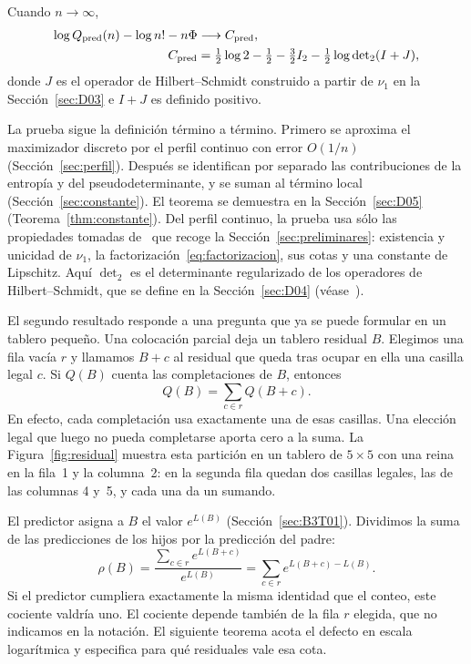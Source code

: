 \begin{teorema}\label{thm:intro-constante}
Cuando $n\to\infty$,
\[
\begin{aligned}
 \log Q_{\rm pred}(n)-\log n!-n\Phi &\longrightarrow C_{\rm pred},\\
 C_{\rm pred} &=\tfrac12\log2-\tfrac12-\tfrac32I_2-\tfrac12\log{\det}_2(I+J),
\end{aligned}
\]
donde $J$ es el operador de Hilbert--Schmidt construido a partir de $\nu_1$ en la
Sección~\ref{sec:D03} e $I+J$ es definido positivo.
\end{teorema}

La prueba sigue la definición término a término. Primero se aproxima el maximizador discreto por
el perfil continuo con error $O(1/n)$ (Sección~\ref{sec:perfil}). Después se identifican por
separado las contribuciones de la entropía y del pseudodeterminante, y se suman al término local
(Sección~\ref{sec:constante}). El teorema se demuestra en la Sección~\ref{sec:D05}
(Teorema~\ref{thm:constante}). Del perfil continuo, la prueba usa sólo las propiedades tomadas
de~\cite{Perfil} que recoge la Sección~\ref{sec:preliminares}: existencia y unicidad de $\nu_1$, la
factorización~\eqref{eq:factorizacion}, sus cotas y una constante de Lipschitz. Aquí $\det_2$ es el
determinante regularizado de los operadores de
Hilbert--Schmidt, que se define en la Sección~\ref{sec:D04} (véase~\cite[cap.~9]{Simon}).

El segundo resultado responde a una pregunta que ya se puede formular en un tablero pequeño.
Una colocación parcial deja un tablero residual $B$. Elegimos una fila vacía $r$ y llamamos
$B+c$ al residual que queda tras ocupar en ella una casilla legal $c$. Si $Q(B)$ cuenta las
completaciones de $B$, entonces
\[
 Q(B)=\sum_{c\in r} Q(B+c).
\]
En efecto, cada completación usa exactamente una de esas casillas. Una elección legal que luego
no pueda completarse aporta cero a la suma. La Figura~\ref{fig:residual} muestra esta partición
en un tablero de $5\times5$ con una reina en la fila~1 y la columna~2: en la segunda fila quedan dos
casillas legales, las de las columnas 4 y~5, y cada una da un sumando.



El predictor asigna a $B$ el valor $e^{L(B)}$ (Sección~\ref{sec:B3T01}).
Dividimos la suma de las predicciones de los hijos por la predicción del padre:
\[
 \rho(B)=\frac{\sum_{c\in r}e^{L(B+c)}}{e^{L(B)}}
        =\sum_{c\in r}e^{L(B+c)-L(B)} .
\]
Si el predictor cumpliera exactamente la misma identidad que el conteo, este cociente valdría uno.
El cociente depende también de la fila $r$ elegida, que no indicamos en la notación.
El siguiente teorema acota el defecto en escala logarítmica y especifica para qué residuales vale
esa cota.

